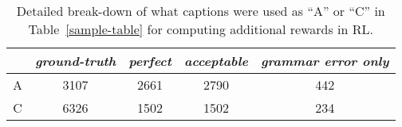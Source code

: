 \begin{table}[t!]
\vspace{-1mm}
  \centering
  \small
  \begin{minipage}{0.58\linewidth}
  \addtolength{\tabcolsep}{-1.6pt}
  \begin{tabular}{ccccc}
    \toprule
      & \emph{ground-truth} & \emph{perfect} & \emph{acceptable} & \emph{grammar error only}\\
     \hline
    A & 3107 & 2661 & 2790 & 442\\
    C & 6326 & 1502  & 1502 & 234\\
    \bottomrule
  \end{tabular}
  \end{minipage}
  \hspace{3mm}
   \begin{minipage}{0.38\linewidth}
    \caption{\small Detailed break-down of what captions were used as ``A'' or ``C'' in Table~\ref{sample-table} for computing additional rewards in RL.}
  \label{info}
  \end{minipage}
   \vspace{-2mm}
\end{table}



